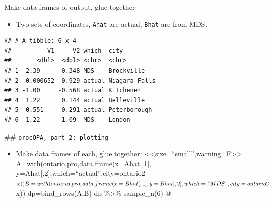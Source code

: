 \documentclass[ignorenonframetext,]{beamer}
\newenvironment{Shaded}{\begin{snugshade}}{\end{snugshade}}
\newcommand{\DataTypeTok}[1]{\textcolor[rgb]{0.13,0.29,0.53}{#1}}
\newcommand{\DecValTok}[1]{\textcolor[rgb]{0.00,0.00,0.81}{#1}}
\newcommand{\KeywordTok}[1]{\textcolor[rgb]{0.13,0.29,0.53}{\textbf{#1}}}
\newcommand{\NormalTok}[1]{#1}
\newcommand{\OperatorTok}[1]{\textcolor[rgb]{0.81,0.36,0.00}{\textbf{#1}}}
\newcommand{\StringTok}[1]{\textcolor[rgb]{0.31,0.60,0.02}{#1}}
\providecommand{\tightlist}{%
  \setlength{\itemsep}{0pt}\setlength{\parskip}{0pt}}
\begin{document}
\begin{frame}[fragile]{Make data frames of output, glue together}
\protect\hypertarget{make-data-frames-of-output-glue-together}{}

\begin{itemize}
\tightlist
\item
  Two sets of coordinates, \texttt{Ahat} are actual, \texttt{Bhat} are
  from MDS.
\end{itemize}

\begin{Shaded}
\end{Shaded}

\begin{verbatim}
## # A tibble: 6 x 4
##          V1     V2 which  city         
##       <dbl>  <dbl> <chr>  <chr>        
## 1  2.39      0.348 MDS    Brockville   
## 2  0.000652 -0.929 actual Niagara Falls
## 3 -1.00     -0.568 actual Kitchener    
## 4  1.22      0.144 actual Belleville   
## 5  0.551     0.291 actual Peterborough 
## 6 -1.22     -1.09  MDS    London
\end{verbatim}

\#\# \texttt{procOPA,\ part\ 2:\ plotting}

\begin{itemize}
\tightlist
\item
  Make data frames of each, glue together:
  \textless{}\textless{}size=``small'',warning=F\textgreater{}\textgreater{}=
  A=with(ontario.pro,data.frame(x=Ahat{[},1{]},
  y=Ahat{[},2{]},which=``actual'',city=ontario2\(x))  B=with(ontario.pro,data.frame(x=Bhat[,1],  y=Bhat[,2],which="MDS",city=ontario2\)x))
  dp=bind\_rows(A,B) dp \%\textgreater{}\% sample\_n(6) @
\end{itemize}

\end{frame}
\end{document}

